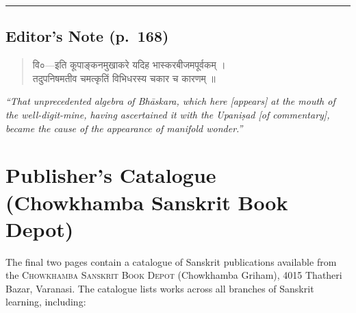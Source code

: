 \documentclass[11pt,a4paper]{article}
\newcommand{\longline}{\noindent\rule{\textwidth}{0.4pt}}
\newcommand{\cnote}[1]{\textcolor{notecolor}{\textit{#1}}}
\newcommand{\dev}[1]{{\devanagarifont #1}}
\newenvironment{sanskritverse}{%
  \begin{quote}
}{%
  \end{quote}
}
\begin{document}
\longline

\subsection*{Editor's Note (p.\ 168)}

\begin{sanskritverse}
\dev{%
वि०—इति कूपाङ्कनमुखाकरे यदिह भास्करबीजमपूर्वकम् ।\\
तदुपनिषमतीव चमत्कृतिं विभिधरस्य चकार च कारणम् ॥}
\end{sanskritverse}

\cnote{``That unprecedented algebra of Bhāskara, which here [appears] at the mouth of the well-digit-mine, having ascertained it with the Upaniṣad [of commentary], became the cause of the appearance of manifold wonder.''}

\section*{Publisher's Catalogue (Chowkhamba Sanskrit Book Depot)}

The final two pages contain a catalogue of Sanskrit publications available from the \textsc{Chowkhamba Sanskrit Book Depot} (Chowkhamba Griham), 4015 Thatheri Bazar, Varanasi. The catalogue lists works across all branches of Sanskrit learning, including:
\end{document}
